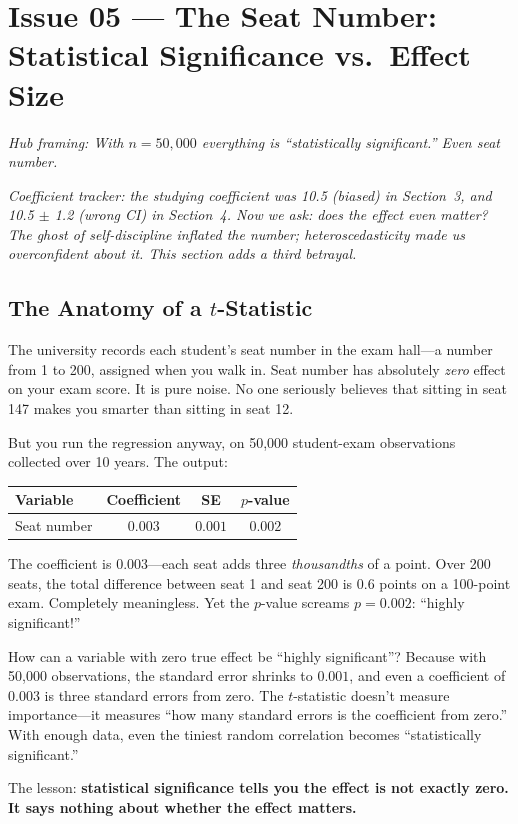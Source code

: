 \documentclass[11pt,a4paper]{article}
\theoremstyle{definition}
\theoremstyle{plain}
\theoremstyle{remark}
\begin{document}
\section{Issue 05 --- The Seat Number: Statistical Significance vs.\ Effect Size}\label{sec:significance}

\noindent\emph{Hub framing: With $n = 50{,}000$ everything is ``statistically significant.'' Even seat number.}

\noindent\textit{Coefficient tracker: the studying coefficient was 10.5 (biased) in Section~3, and 10.5 $\pm$ 1.2 (wrong CI) in Section~4. Now we ask: does the effect even matter? The ghost of self-discipline inflated the number; heteroscedasticity made us overconfident about it. This section adds a third betrayal.}

\subsection{The Anatomy of a $t$-Statistic}

\begin{toystory}[title={The Seat Number That ``Predicts'' Your Grade}]
The university records each student's seat number in the exam hall---a number from 1 to 200, assigned when you walk in. Seat number has absolutely \emph{zero} effect on your exam score. It is pure noise. No one seriously believes that sitting in seat 147 makes you smarter than sitting in seat 12.

But you run the regression anyway, on 50{,}000 student-exam observations collected over 10 years. The output:

\begin{center}
\begin{tabular}{@{}lccc@{}}
\toprule
Variable & Coefficient & SE & $p$-value \\
\midrule
Seat number & $0.003$ & $0.001$ & $0.002$ \\
\bottomrule
\end{tabular}
\end{center}

The coefficient is $0.003$---each seat adds three \emph{thousandths} of a point. Over 200 seats, the total difference between seat 1 and seat 200 is $0.6$ points on a 100-point exam. Completely meaningless. Yet the $p$-value screams $p = 0.002$: ``highly significant!''

How can a variable with zero true effect be ``highly significant''? Because with 50{,}000 observations, the standard error shrinks to $0.001$, and even a coefficient of $0.003$ is three standard errors from zero. The $t$-statistic doesn't measure importance---it measures ``how many standard errors is the coefficient from zero.'' With enough data, even the tiniest random correlation becomes ``statistically significant.''

The lesson: \textbf{statistical significance tells you the effect is not exactly zero. It says nothing about whether the effect matters.}
\end{toystory}
\end{document}
